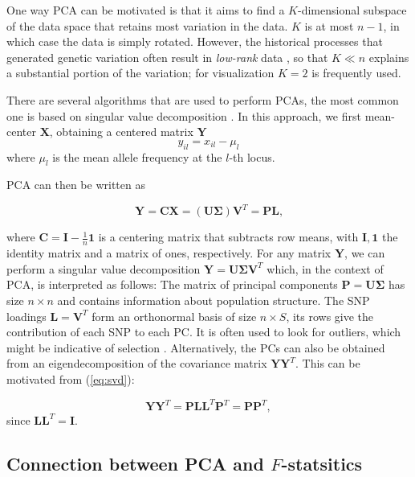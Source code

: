 \documentclass[12pt,fullpage, a4paper]{article}
\newcommand{\MX}{\mathbf{X}} %
\newcommand{\MC}{\mathbf{C}} %
\newcommand{\MY}{\mathbf{Y}} %
\newcommand{\MP}{\mathbf{P}} %
\newcommand{\ML}{\mathbf{L}} %
\newcommand{\MSINGULAR}{\mathbf{\Sigma}} %
\begin{document}
One way PCA can be motivated is that it aims to find a $K$-dimensional subspace of the data space that retains most  variation in the data. $K$ is at most $n-1$, in which case the data is simply rotated. However, the  historical processes that generated genetic variation often result in \emph{low-rank} data \citep{engelhardt2010}, so that $K \ll n$ explains a substantial portion of the variation; for visualization $K=2$ is frequently used. 
		
There are several algorithms that are used to perform PCAs, the most common one is based on singular value decomposition \citep[e.g.][]{jolliffe2013}. In this approach, we first mean-center $\MX$, obtaining a centered matrix $\MY$
	\begin{equation*}
	y_{il} = x_{il} - \mu_l
	\end{equation*}
	where $\mu_l$ is the mean allele frequency at the $l$-th locus.
	
	PCA can then be written as
	
	\begin{equation}
	\MY = \MC\MX = (\mathbf{U} \MSINGULAR) \mathbf{V}^T = \MP\ML\text{,} \label{eq:svd}
	\end{equation}
	
	where $\MC = \mathbf{I} -\frac{1}{n}\mathbf{1}$ is a centering matrix that subtracts row means, with $\mathbf{I}, \mathbf{1}$  the identity matrix and a matrix of ones, respectively. For any matrix $\MY$, we can perform a singular value decomposition $\MY = \mathbf{U}\MSINGULAR\mathbf{V}^T$ which, in the context of PCA, is interpreted as follows: The matrix of principal components $\MP=\mathbf{U}\MSINGULAR$ has size $n \times n$ and contains information about population structure. The SNP loadings $\ML=\mathbf{V}^T$ form an orthonormal basis of size $n \times S$, its rows give the contribution of each SNP to each PC. It is often used to look for outliers, which might be indicative of selection \citep[e.g][]{duforet-frebourg2016}. Alternatively, the PCs can also be obtained from an eigendecomposition of the covariance matrix $\MY\MY^T$. This can be motivated from (\ref{eq:svd}):
	
	\begin{equation}
	\MY\MY^T = \MP\ML\ML^T\MP^T = \MP\MP^T,
	\end{equation}
	since $\ML\ML^T=\mathbf{I}$.

\subsection{Connection between PCA and $F$-statsitics}	
\end{document}

